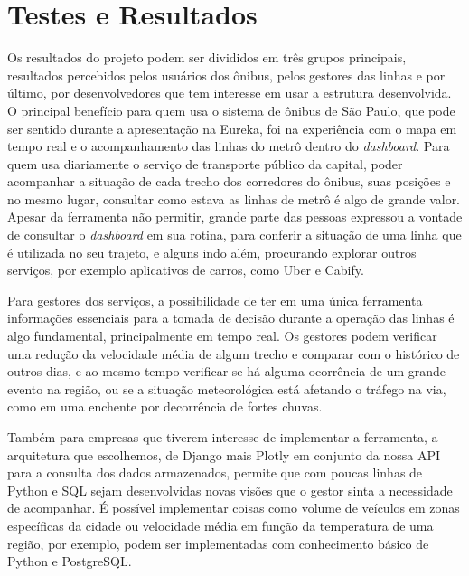 \chapter{Testes e Resultados}
\label{Cap:Resultados}
\newcommand{\EscalaAlgumaCoisa}{0.6}
\indent
\par Os resultados do projeto podem ser divididos em três grupos principais, resultados percebidos pelos usuários dos ônibus, pelos gestores das linhas e por último, por desenvolvedores que tem interesse em usar a estrutura desenvolvida. O principal benefício para quem usa o sistema de ônibus de São Paulo, que pode ser sentido durante a apresentação na Eureka, foi na experiência com o mapa em tempo real e o acompanhamento das linhas do metrô dentro do \textit{dashboard}. Para quem usa diariamente o serviço de transporte público da capital, poder acompanhar a situação de cada trecho dos corredores do ônibus, suas posições e no mesmo lugar, consultar como estava as linhas de metrô é algo de grande valor. Apesar da ferramenta não permitir, grande parte das pessoas expressou a vontade de consultar o \textit{dashboard} em sua rotina, para conferir a situação de uma linha que é utilizada no seu trajeto, e alguns indo além, procurando explorar outros serviços, por exemplo aplicativos de carros, como Uber e Cabify.
\par Para gestores dos serviços, a possibilidade de ter em uma única ferramenta informações essenciais para a tomada de decisão durante a operação das linhas é algo fundamental, principalmente em tempo real. Os gestores podem verificar uma redução da velocidade média de algum trecho e comparar com o histórico de outros dias, e ao mesmo tempo verificar se há alguma ocorrência de um grande evento na região, ou se a situação meteorológica está afetando o tráfego na via, como em uma enchente por decorrência de fortes chuvas.
\indent
\par Também para empresas que tiverem interesse de implementar a ferramenta, a arquitetura que escolhemos, de Django mais Plotly em conjunto da nossa API para a consulta dos dados armazenados, permite que com poucas linhas de Python e SQL sejam desenvolvidas novas visões que o gestor sinta a necessidade de acompanhar. É possível implementar coisas como volume de veículos em zonas específicas da cidade ou velocidade média em função da temperatura de uma região, por exemplo, podem ser implementadas com conhecimento básico de Python e PostgreSQL.
\indent
